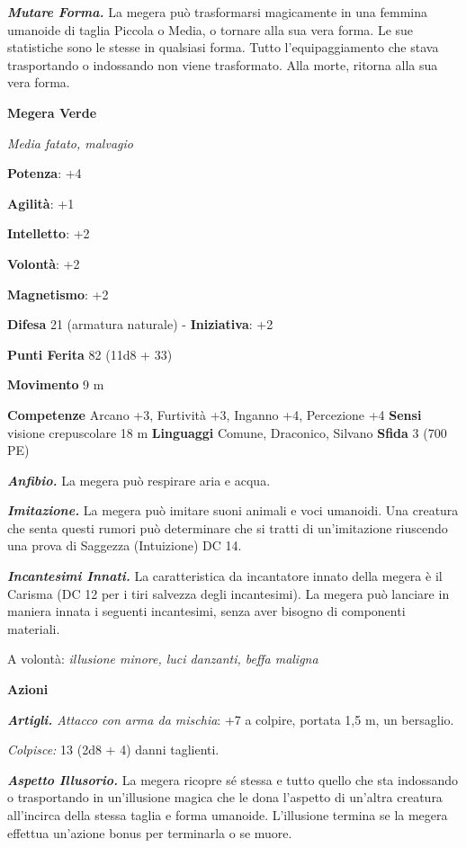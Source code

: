 \begin{multicols}{2}
\emph{\textbf{Mutare Forma.}} La megera può trasformarsi magicamente in
una femmina umanoide di taglia Piccola o Media, o tornare alla sua vera
forma. Le sue statistiche sono le stesse in qualsiasi forma. Tutto
l'equipaggiamento che stava trasportando o indossando non viene
trasformato. Alla morte, ritorna alla sua vera forma.



\textbf{Megera Verde}

\emph{Media fatato, malvagio}

\textbf{Potenza}: +4

\textbf{Agilità}: +1

\textbf{Intelletto}: +2

\textbf{Volontà}: +2

\textbf{Magnetismo}: +2

\textbf{Difesa} 21 (armatura naturale) - \textbf{Iniziativa}: +2

\textbf{Punti Ferita} 82 (11d8 + 33)

\textbf{Movimento} 9 m

\textbf{Competenze} Arcano +3, Furtività +3, Inganno +4, Percezione +4
\textbf{Sensi} visione crepuscolare 18 m
\textbf{Linguaggi} Comune, Draconico, Silvano \textbf{Sfida} 3 (700 PE)

\emph{\textbf{Anfibio.}} La megera può respirare aria e acqua.

\emph{\textbf{Imitazione.}} La megera può imitare suoni animali e voci
umanoidi. Una creatura che senta questi rumori può determinare che si
tratti di un'imitazione riuscendo una prova di Saggezza (Intuizione) DC
14.

\emph{\textbf{Incantesimi Innati.}} La caratteristica da incantatore
innato della megera è il Carisma (DC 12 per i tiri salvezza degli
incantesimi). La megera può lanciare in maniera innata i seguenti
incantesimi, senza aver bisogno di componenti materiali.

A volontà: \emph{illusione minore, luci danzanti, beffa maligna}

\textbf{Azioni}

\emph{\textbf{Artigli.} Attacco con arma da mischia}: +7 a colpire,
portata 1,5 m, un bersaglio.

\emph{Colpisce:} 13 (2d8 + 4) danni taglienti.

\emph{\textbf{Aspetto Illusorio.}} La megera ricopre sé stessa e tutto
quello che sta indossando o trasportando in un'illusione magica che le
dona l'aspetto di un'altra creatura all'incirca della stessa taglia e
forma umanoide. L'illusione termina se la megera effettua un'azione
bonus per terminarla o se muore.


\end{multicols}
